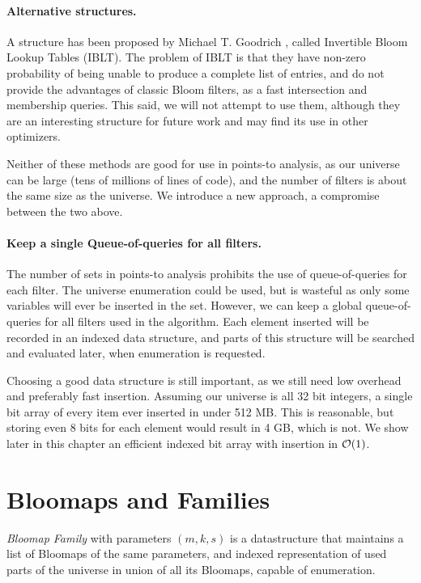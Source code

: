 \paragraph{Alternative structures.} A structure has been proposed by Michael T.
Goodrich \cite{goodrich:2011}, called Invertible Bloom Lookup Tables (IBLT). The
problem of IBLT is that they have non-zero probability of being unable to
produce a complete list of entries, and do not provide the advantages of classic
Bloom filters, as a fast intersection and membership queries. This said, we will
not attempt to use them, although they are an interesting structure for future
work and may find its use in other optimizers.

Neither of these methods are good for use in points-to analysis, as our universe
can be large (tens of millions of lines of code), and the number of filters is about the
same size as the universe. We introduce a new approach, a compromise between the
two above.

\paragraph{Keep a single Queue-of-queries for all filters.} The number of sets
in points-to analysis prohibits the use of queue-of-queries for each filter. The universe
enumeration could be used, but is wasteful as only some variables will ever be
inserted in the set. However, we can keep a global queue-of-queries for all
filters used in the algorithm. Each element inserted will be recorded in an
indexed data structure, and parts of this structure will be searched and
evaluated later, when enumeration is requested.

Choosing a good data structure is still important, as we still need low overhead
and preferably fast insertion. Assuming our universe is all 32 bit integers, a
single bit array of every item ever inserted in under 512 MB. This is
reasonable, but storing even 8 bits for each element would result in 4 GB, which
is not. We show later in this chapter an efficient indexed bit array with
insertion in $\mathcal{O}(1)$.


\section{Bloomaps and Families}

{\it Bloomap Family} with parameters $(m, k, s)$ is a datastructure that
maintains a list of Bloomaps of the same parameters, and indexed representation
of used parts of the universe in union of all its Bloomaps, capable of
enumeration.


